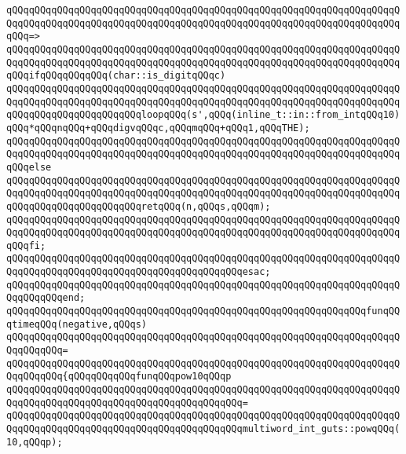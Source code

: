 \verb|qQQqqQQqqQQqqQQqqQQqqQQqqQQqqQQqqQQqqQQqqQQqqQQqqQQqqQQqqQQqqQQqqQQqqQQqqQQqqQQqqQQqqQQqqQQqqQQqqQQqqQQqqQQqqQQqqQQqqQQqqQQqqQQqqQQqqQQqqQQqqQQq=>|\newline
\verb|qQQqqQQqqQQqqQQqqQQqqQQqqQQqqQQqqQQqqQQqqQQqqQQqqQQqqQQqqQQqqQQqqQQqqQQqqQQqqQQqqQQqqQQqqQQqqQQqqQQqqQQqqQQqqQQqqQQqqQQqqQQqqQQqqQQqqQQqqQQqqQQqifqQQqqQQqqQQq(char::is_digitqQQqc)|\newline
\newline
\verb|qQQqqQQqqQQqqQQqqQQqqQQqqQQqqQQqqQQqqQQqqQQqqQQqqQQqqQQqqQQqqQQqqQQqqQQqqQQqqQQqqQQqqQQqqQQqqQQqqQQqqQQqqQQqqQQqqQQqqQQqqQQqqQQqqQQqqQQqqQQqqQQqqQQqqQQqqQQqqQQqqQQqloopqQQq(s',qQQq(inline_t::in::from_intqQQq10)qQQq*qQQqnqQQq+qQQqdigvqQQqc,qQQqmqQQq+qQQq1,qQQqTHE);|\newline
\verb|qQQqqQQqqQQqqQQqqQQqqQQqqQQqqQQqqQQqqQQqqQQqqQQqqQQqqQQqqQQqqQQqqQQqqQQqqQQqqQQqqQQqqQQqqQQqqQQqqQQqqQQqqQQqqQQqqQQqqQQqqQQqqQQqqQQqqQQqqQQqqQQqelse|\newline
\verb|qQQqqQQqqQQqqQQqqQQqqQQqqQQqqQQqqQQqqQQqqQQqqQQqqQQqqQQqqQQqqQQqqQQqqQQqqQQqqQQqqQQqqQQqqQQqqQQqqQQqqQQqqQQqqQQqqQQqqQQqqQQqqQQqqQQqqQQqqQQqqQQqqQQqqQQqqQQqqQQqqQQqretqQQq(n,qQQqs,qQQqm);|\newline
\verb|qQQqqQQqqQQqqQQqqQQqqQQqqQQqqQQqqQQqqQQqqQQqqQQqqQQqqQQqqQQqqQQqqQQqqQQqqQQqqQQqqQQqqQQqqQQqqQQqqQQqqQQqqQQqqQQqqQQqqQQqqQQqqQQqqQQqqQQqqQQqqQQqfi;|\newline
\verb|qQQqqQQqqQQqqQQqqQQqqQQqqQQqqQQqqQQqqQQqqQQqqQQqqQQqqQQqqQQqqQQqqQQqqQQqqQQqqQQqqQQqqQQqqQQqqQQqqQQqqQQqqQQqqQQqesac;|\newline
\verb|qQQqqQQqqQQqqQQqqQQqqQQqqQQqqQQqqQQqqQQqqQQqqQQqqQQqqQQqqQQqqQQqqQQqqQQqqQQqqQQqend;|\newline
\newline
\verb|qQQqqQQqqQQqqQQqqQQqqQQqqQQqqQQqqQQqqQQqqQQqqQQqqQQqqQQqqQQqqQQqfunqQQqtimeqQQq(negative,qQQqs)|\newline
\verb|qQQqqQQqqQQqqQQqqQQqqQQqqQQqqQQqqQQqqQQqqQQqqQQqqQQqqQQqqQQqqQQqqQQqqQQqqQQqqQQq=|\newline
\verb|qQQqqQQqqQQqqQQqqQQqqQQqqQQqqQQqqQQqqQQqqQQqqQQqqQQqqQQqqQQqqQQqqQQqqQQqqQQqqQQq{qQQqqQQqqQQqfunqQQqpow10qQQqp|\newline
\verb|qQQqqQQqqQQqqQQqqQQqqQQqqQQqqQQqqQQqqQQqqQQqqQQqqQQqqQQqqQQqqQQqqQQqqQQqqQQqqQQqqQQqqQQqqQQqqQQqqQQqqQQqqQQqqQQq=|\newline
\verb|qQQqqQQqqQQqqQQqqQQqqQQqqQQqqQQqqQQqqQQqqQQqqQQqqQQqqQQqqQQqqQQqqQQqqQQqqQQqqQQqqQQqqQQqqQQqqQQqqQQqqQQqqQQqqQQqmultiword_int_guts::powqQQq(10,qQQqp);|\newline
